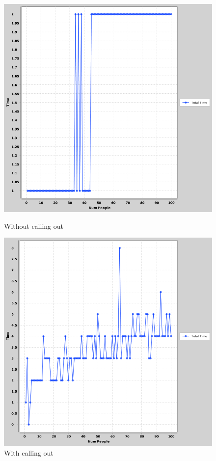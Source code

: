 \documentclass[a4paper, 12pt]{article}
\begin{document}
			\begin{figure}[H]
  				\includegraphics[width=\linewidth]{numpeople-vs-time(split-for-unvisted)2}
  				\caption{Without calling out}
			\endminipage\hfill
  				\includegraphics[width=\linewidth]{numpeople-vs-time(with-callingout)}
  				\caption{With calling out}
				\endminipage\hfill
			\end{figure}			
	
\end{document}
